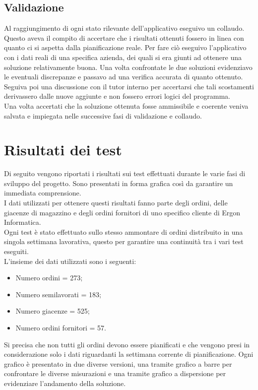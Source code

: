 \subsection{Validazione}

Al raggiungimento di ogni stato rilevante dell'applicativo eseguivo un collaudo. Questo aveva il compito di accertare che i risultati ottenuti fossero in linea con
quanto ci si aspetta dalla pianificazione reale. Per fare ciò eseguivo l'applicativo con i dati reali di una specifica azienda, dei quali si era giunti ad ottenere
una soluzione relativamente buona. Una volta confrontate le due soluzioni evidenziavo le eventuali discrepanze e passavo ad una verifica accurata di quanto ottenuto.
Seguiva poi una discussione con il tutor interno per accertarsi che tali scostamenti derivassero dalle nuove aggiunte e non fossero errori logici del programma.\\ Una volta 
accertati che la soluzione ottenuta fosse ammissibile e coerente veniva salvata e impiegata nelle successive fasi di validazione e collaudo.

\section{Risultati dei test}

Di seguito vengono riportati i risultati sui test effettuati durante le varie fasi di sviluppo del progetto. Sono presentati in forma grafica così da garantire un immediata
comprensione.\\ I dati utilizzati per ottenere questi risultati fanno parte degli ordini, delle giacenze di magazzino 
e degli ordini fornitori di uno specifico cliente di Ergon Informatica.\\
Ogni test è stato effettuato sullo stesso ammontare di ordini distribuito in una singola settimana lavorativa, questo per garantire una continuità tra i vari test eseguiti.\\
L'insieme dei dati utilizzati sono i seguenti:
\begin{itemize}
    \item Numero ordini = 273;
    \item Numero semilavorati = 183;
    \item Numero giacenze = 525;
    \item Numero ordini fornitori = 57.
\end{itemize}

Si precisa che non tutti gli ordini devono essere pianificati e che vengono presi in considerazione solo i dati riguardanti la settimana corrente di pianificazione.
Ogni grafico è presentato in due diverse versioni, una tramite grafico a barre per confrontare le diverse misurazioni e una tramite grafico a dispersione per evidenziare
l'andamento della soluzione.
